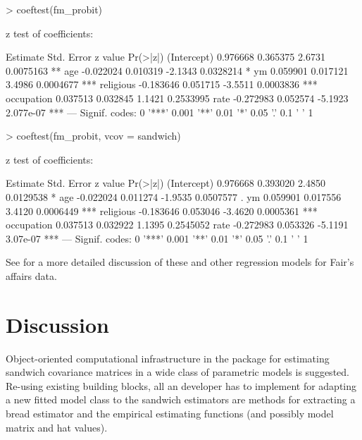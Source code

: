 \documentclass{Z}
\begin{document}
\begin{Schunk}
\begin{Sinput}
> coeftest(fm_probit)
\end{Sinput}
\begin{Soutput}
z test of coefficients:

             Estimate Std. Error z value  Pr(>|z|)    
(Intercept)  0.976668   0.365375  2.6731 0.0075163 ** 
age         -0.022024   0.010319 -2.1343 0.0328214 *  
ym           0.059901   0.017121  3.4986 0.0004677 ***
religious   -0.183646   0.051715 -3.5511 0.0003836 ***
occupation   0.037513   0.032845  1.1421 0.2533995    
rate        -0.272983   0.052574 -5.1923 2.077e-07 ***
---
Signif. codes:  0 '***' 0.001 '**' 0.01 '*' 0.05 '.' 0.1 ' ' 1 
\end{Soutput}
\begin{Sinput}
> coeftest(fm_probit, vcov = sandwich)
\end{Sinput}
\begin{Soutput}
z test of coefficients:

             Estimate Std. Error z value  Pr(>|z|)    
(Intercept)  0.976668   0.393020  2.4850 0.0129538 *  
age         -0.022024   0.011274 -1.9535 0.0507577 .  
ym           0.059901   0.017556  3.4120 0.0006449 ***
religious   -0.183646   0.053046 -3.4620 0.0005361 ***
occupation   0.037513   0.032922  1.1395 0.2545052    
rate        -0.272983   0.053326 -5.1191  3.07e-07 ***
---
Signif. codes:  0 '***' 0.001 '**' 0.01 '*' 0.05 '.' 0.1 ' ' 1 
\end{Soutput}
\end{Schunk}

See \cite{hac:Greene:2003} for a more detailed discussion of these and other
regression models for Fair's affairs data.


\section{Discussion} \label{sec:disc}

Object-oriented computational infrastructure in the  package 
for estimating sandwich covariance matrices in a wide class of parametric models is suggested.
Re-using existing building blocks, all an  developer has to implement for adapting
a new fitted model class to the sandwich estimators are methods for extracting a bread
estimator and the empirical estimating functions (and possibly model matrix and hat values).
\end{document}

